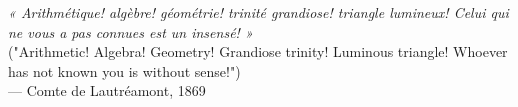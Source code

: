 \begin{flushright}
\emph{« Arithmétique! algèbre! géométrie! trinité grandiose! triangle lumineux! Celui qui ne vous a pas connues est un insensé! »} \\
("Arithmetic! Algebra! Geometry! Grandiose trinity! Luminous triangle! Whoever has not known you is without sense!") \\
— Comte de Lautréamont, 1869
\end{flushright}



